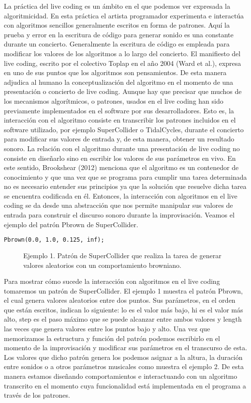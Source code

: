 La práctica del live coding es un ámbito en el que podemos ver expresada la algoritmicidad. En esta práctica el artista programador experimenta e interactúa con algoritmos sencillos generalmente escritos en forma de patrones. Aquí la prueba y error en la escritura de código para generar sonido es una constante durante un concierto. Generalmente la escritura de código es empleada para modificar los valores de los algoritmos a lo largo del concierto. El manifiesto del live coding, escrito por el colectivo Toplap en el año 2004 (Ward et al.), expresa en uno de sus puntos que los algoritmos son pensamientos. De esta manera adjudica al humano la conceptualización del algoritmo en el momento de una presentación o concierto de live coding. Aunque hay que precisar que muchos de los mecanismos algorítmicos, o patrones, usados en el live coding han sido previamente implementados en el software por sus desarrolladores. Esto es, la interacción con el algoritmo consiste en transcribir los patrones incluidos en el software utilizado, por ejemplo SuperCollider o TidalCycles, durante el concierto para modificar sus valores de entrada y, de esta manera, obtener un resultado sonoro. La relación con el algoritmo durante una presentación de live coding no consiste en diseñarlo sino en escribir los valores de sus parámetros en vivo. En este sentido, Brookshear (2012) menciona que el algoritmo es un contenedor de conocimiento y que una vez que se programa para cumplir una tarea determinada no es necesario entender sus principios ya que la solución que resuelve dicha tarea se encuentra codificada en él. Entonces, la interacción con algoritmos en el live coding se da desde una abstracción que nos permite manipular sus valores de entrada para construir el discurso sonoro durante la improvisación. Veamos el ejemplo del patrón Pbrown de SuperCollider.

\begin{verbatim}
Pbrown(0.0, 1.0, 0.125, inf);
\end{verbatim}

\begin{figure}[h]
Ejemplo 1. Patrón de SuperCollider que realiza la tarea de generar valores aleatorios con un comportamiento browniano.
\end{figure}

Para mostrar cómo sucede la interacción con algoritmos en el live coding tomaremos un patrón de SuperCollider. El ejemplo 1 muestra el patrón Pbrown, el cual genera valores aleatorios entre dos puntos. Sus parámetros, en el orden que están escritos, indican lo siguiente: lo es el valor más bajo, hi es el valor más alto, step es el paso máximo que se puede alcanzar entre ambos valores y length las veces que genera valores entre los puntos bajo y alto. Una vez que memorizamos la estructura y función del patrón podemos escribirlo en el momento de la improvisación y modificar sus parámetros en el transcurso de esta. Los valores que dicho patrón genera los podemos asignar a la altura, la duración entre sonidos o a otros parámetros musicales como muestra el ejemplo 2. De esta manera estamos diseñando comportamientos e interactuando con un algoritmo transcrito en el momento cuya funcionalidad está implementada en el programa a través de los patrones.

